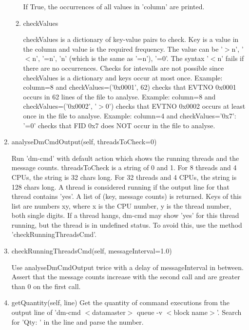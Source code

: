 \documentclass[12pt,a4paper]{report}
\begin{document}
\begin{enumerate}
\begin{enumerate}
If True, the occurrences of all values in 'column' are printed.
\item checkValues

checkValues is a dictionary of key-value pairs to check. Key is a value
in the column and value is the required frequency.
The value can be '$>$n', '$<$n', '=n', 'n' (which is the same as '=n'), '=0'.
The syntax '$<$n' fails if there are no occurrences.
Checks for intevalls are not possible since checkValues is a dictionary
and keys occur at most once.
Example: column=8 and checkValues={('0x0001', 62)} checks that EVTNO 0x0001
occurs in 62 lines of the file to analyse.
Example: column=8 and checkValues={('0x0002', '$>$0')} checks that EVTNO 0x0002
occurs at least once in the file to analyse.
Example: column=4 and checkValues={'0x7': '=0'} checks that FID 0x7 does
NOT occur in the file to analyse.
\end{enumerate}
\item analyseDmCmdOutput(self, threadsToCheck=0)

Run 'dm-cmd' with default action which shows the running threads and
the message counts. threadsToCheck is a string of 0 and 1.
For 8 threads and 4 CPUs, the string is 32 chars long.
For 32 threads and 4 CPUs, the string is 128 chars long.
A thread is considered running if the output line for that thread contains 'yes'.
A list of (key, message counts) is returned. Keys of this list are numbers xy,
where x is the CPU number, y is the thread number, both single digits.
If a thread hangs, dm-cmd may show 'yes' for this thread running, but the
thread is in undefined status. To avoid this, use the method 'checkRunningThreadsCmd'.

\item checkRunningThreadsCmd(self, messageInterval=1.0)

Use analyseDmCmdOutput twice with a delay of messageInterval in between.
Assert that the message counts increase with the second call and are greater
than 0 on the first call.

\item getQuantity(self, line)
Get the quantity of command executions from the output line
of 'dm-cmd $<$datamaster$>$ queue -v $<$block name$>$'.
    Search for 'Qty: ' in the line and parse the number.


\end{enumerate}
\end{document}
